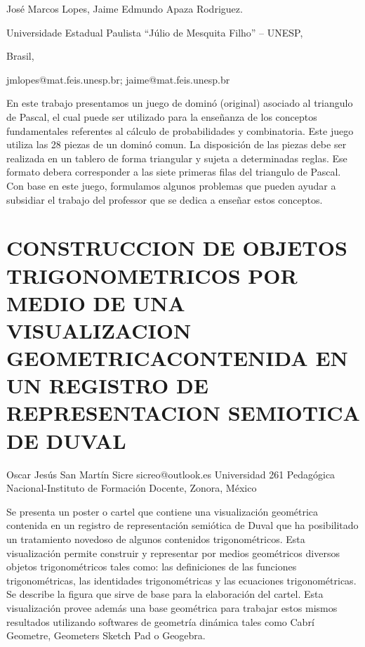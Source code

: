 \begin{datos}

José Marcos Lopes, Jaime Edmundo Apaza Rodriguez.

Universidade Estadual Paulista “Júlio de Mesquita Filho” – UNESP,

Brasil,

jmlopes@mat.feis.unesp.br; jaime@mat.feis.unesp.br 

\end{datos}

En este trabajo presentamos un juego de dominó (original) asociado
al triangulo de Pascal, el cual puede ser utilizado para la enseñanza
de los conceptos fundamentales referentes al cálculo de probabilidades
y combinatoria. Este juego utiliza las 28 piezas de un dominó comun.
La disposición de las piezas debe ser realizada en un tablero de forma
triangular y sujeta a determinadas reglas. Ese formato debera corresponder
a las siete primeras filas del triangulo de Pascal. Con base en este
juego, formulamos algunos problemas que pueden ayudar a subsidiar
el trabajo del professor que se dedica a enseñar estos conceptos.


\section{CONSTRUCCION DE OBJETOS TRIGONOMETRICOS POR MEDIO DE UNA VISUALIZACION
GEOMETRICACONTENIDA EN UN REGISTRO DE REPRESENTACION SEMIOTICA DE
DUVAL}

\begin{datos}

Oscar Jesús San Martín Sicre sicreo@outlook.es Universidad 261 Pedagógica
Nacional-Instituto de Formación Docente, Zonora, México 

\end{datos}

Se presenta un poster o cartel que contiene una visualización geométrica
contenida en un registro de representación semiótica de Duval que
ha posibilitado un tratamiento novedoso de algunos contenidos trigonométricos.
Esta visualización permite construir y representar por medios geométricos
diversos objetos trigonométricos tales como: las definiciones de las
funciones trigonométricas, las identidades trigonométricas y las ecuaciones
trigonométricas. Se describe la figura que sirve de base para la elaboración
del cartel. Esta visualización provee además una base geométrica para
trabajar estos mismos resultados utilizando softwares de geometría
dinámica tales como Cabrí Geometre, Geometers Sketch Pad o Geogebra. 


